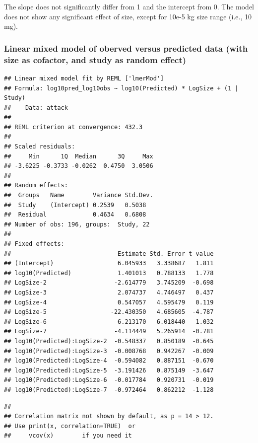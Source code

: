 The slope does not significantly differ from 1 and the intercept from 0.
The model does not show any significant effect of size, except for 10e-5
kg size range (i.e., 10 mg).

\hypertarget{linear-mixed-model-of-oberved-versus-predicted-data-with-size-as-cofactor-and-study-as-random-effect}{%
\subsubsection{Linear mixed model of oberved versus predicted data (with
size as cofactor, and study as random
effect)}\label{linear-mixed-model-of-oberved-versus-predicted-data-with-size-as-cofactor-and-study-as-random-effect}}

\begin{verbatim}
## Linear mixed model fit by REML ['lmerMod']
## Formula: log10pred_log10obs ~ log10(Predicted) * LogSize + (1 | Study)
##    Data: attack
## 
## REML criterion at convergence: 432.3
## 
## Scaled residuals: 
##     Min      1Q  Median      3Q     Max 
## -3.6225 -0.3733 -0.0262  0.4750  3.0506 
## 
## Random effects:
##  Groups   Name        Variance Std.Dev.
##  Study    (Intercept) 0.2539   0.5038  
##  Residual             0.4634   0.6808  
## Number of obs: 196, groups:  Study, 22
## 
## Fixed effects:
##                              Estimate Std. Error t value
## (Intercept)                  6.045933   3.338687   1.811
## log10(Predicted)             1.401013   0.788133   1.778
## LogSize-2                   -2.614779   3.745209  -0.698
## LogSize-3                    2.074737   4.746497   0.437
## LogSize-4                    0.547057   4.595479   0.119
## LogSize-5                  -22.430350   4.685605  -4.787
## LogSize-6                    6.213170   6.018440   1.032
## LogSize-7                   -4.114449   5.265914  -0.781
## log10(Predicted):LogSize-2  -0.548337   0.850189  -0.645
## log10(Predicted):LogSize-3  -0.008768   0.942267  -0.009
## log10(Predicted):LogSize-4  -0.594082   0.887151  -0.670
## log10(Predicted):LogSize-5  -3.191426   0.875149  -3.647
## log10(Predicted):LogSize-6  -0.017784   0.920731  -0.019
## log10(Predicted):LogSize-7  -0.972464   0.862212  -1.128
\end{verbatim}

\begin{verbatim}
## 
## Correlation matrix not shown by default, as p = 14 > 12.
## Use print(x, correlation=TRUE)  or
##     vcov(x)        if you need it
\end{verbatim}

